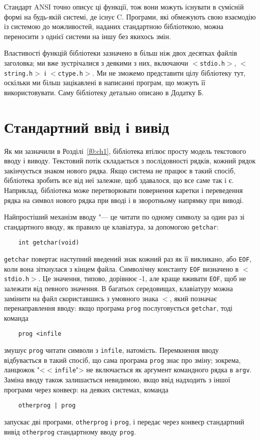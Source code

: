 \documentclass[a4paper,12pt]{book}
\begin{document}
  Стандарт ANSI точно описує ці функції, тож вони можуть існувати в сумісній формі на
  будь-якій системі, де існує C. Програми, які обмежують свою взаємодію із системою до
  можливостей, наданих стандартною бібліотекою, можна переносити з однієї системи на
  іншу без якихось змін.

  Властивості функцій бібліотеки зазначено в більш ніж двох десятках файлів заголовка; ми
  вже зустрічалися з деякими з них, включаючи \texttt{\mbox{$<$}stdio.h\mbox{$>$}},
  \texttt{\mbox{$<$}string.h\mbox{$>$}} і \texttt{\mbox{$<$}ctype.h\mbox{$>$}}. Ми не зможемо представити цілу
  бібліотеку тут, оскільки ми більш зацікавлені в написанні програм, що можуть її
  використовувати. Саму бібліотеку детально описано в Додатку Б.

\section{Стандартний ввід і вивід}

\label{f0:ch7.1}
  Як ми зазначили в Розділі~\ref{f0:ch1}, бібліотека втілює просту модель
  текстового вводу і виводу. Текстовий потік складається з послідовності рядків, кожний
  рядок закінчується знаком нового рядка. Якщо система не працює в такий спосіб,
  бібліотека зробить все від неї залежне, щоб здавалося, що все саме так і є. Наприклад,
  бібліотека може перетворювати повернення каретки і переведення рядка на символ нового
  рядка при вводі і в зворотньому напрямку при виводі.

  Найпростіший механізм вводу "--- це читати по одному символу за один раз зі
  стандартного вводу, як правило це клавіатура, за допомогою \texttt{getchar}:
  \begin{verbatim}
    int getchar(void)
  \end{verbatim}

  \texttt{getchar} повертає наступний введений знак кожний раз як її викликано, або
  \texttt{EOF}, коли вона зіткнулася з кінцем файла. Символічну константу \texttt{EOF}
  визначено в \texttt{\mbox{$<$}stdio.h\mbox{$>$}}. Це значення, типово, дорівнює -1, але краще
  вживати \texttt{EOF}, щоб не залежати від певного значення. В багатьох середовищах,
  клавіатуру можна замінити на файл скориставшись з умовного знака \texttt{\mbox{$<$}}, який
  позначає перенаправлення вводу: якщо програма \texttt{prog} послуговується
  \texttt{getchar}, тоді команда
  \begin{verbatim}
    prog <infile
  \end{verbatim}
  змушує \texttt{prog} читати символи з \texttt{infile}, натомість. Перемкнення вводу
  відбувається в такий спосіб, що сама програма \texttt{prog} знає про зміну; зокрема,
  ланцюжок "<\texttt{\mbox{$<$}infile}"> не включається як аргумент командного рядка
  в \texttt{argv}. Заміна вводу також залишається невидимою, якщо ввід надходить з іншої
  програми через конвеєр: на деяких системах, команда
  \begin{verbatim}
    otherprog | prog
  \end{verbatim}
  запускає дві програми, \texttt{otherprog} і \texttt{prog}, і передає через конвеєр
  стандартний вивід \texttt{otherprog} стандартному вводу \texttt{prog}.
\end{document}
